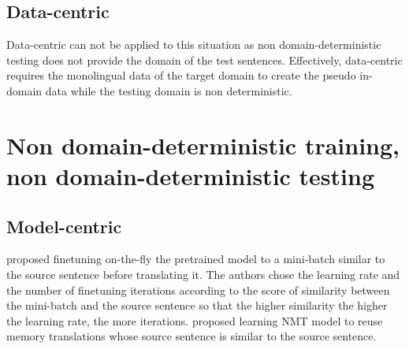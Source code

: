 \subsection{Data-centric} \label{ssec:data-centric}
Data-centric can not be applied to this situation as non domain-deterministic testing does not provide the domain of the test sentences. Effectively, data-centric requires the monolingual data of the target domain to create the pseudo in-domain data while the testing domain is non deterministic.
\section{Non domain-deterministic training, non domain-deterministic testing}
\label{sec:case4}
\subsection{Model-centric}
\cite{Li18onesentence, Farajian17multidomain} proposed finetuning on-the-fly the pretrained model to a mini-batch similar to the source sentence before translating it. The authors chose the learning rate and the number of finetuning iterations according to the score of similarity between the mini-batch and the source sentence so that the higher similarity the higher the learning rate, the more iterations. \cite{Pham20Priming,xu20boosting,Bulte19neural} proposed learning NMT model to reuse memory translations whose source sentence is similar to the source sentence. 
